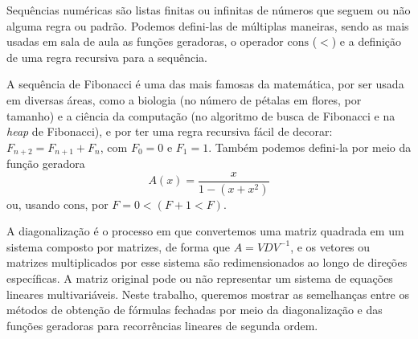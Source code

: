 
Sequências numéricas são listas finitas ou infinitas de números que seguem ou não alguma regra ou padrão. Podemos defini-las de múltiplas maneiras, sendo as mais usadas em sala de aula as funções geradoras, o operador $\mathrm{cons}$ ($<$) e a definição de uma regra recursiva para a sequência.

A sequência de Fibonacci é uma das mais famosas da matemática, por ser usada em diversas áreas, como a biologia (no número de pétalas em flores, por tamanho) e a ciência da computação (no algoritmo de busca de Fibonacci e na \textit{heap} de Fibonacci), e por ter uma regra recursiva fácil de decorar: $F_{n+2} = F_{n+1} + F_n$, com $F_0 = 0$ e $F_1 = 1$. Também podemos defini-la por meio da função geradora
\[
  A(x) = \dfrac{x}{1-(x+x^2)}
\]
ou, usando $\mathrm{cons}$, por $F = 0 < (F+1 < F)$.

A diagonalização é o processo em que convertemos uma matriz quadrada em um sistema composto por matrizes, de forma que $A = V D V^{-1}$, e os vetores ou matrizes multiplicados por esse sistema são redimensionados ao longo de direções específicas. A matriz original pode ou não representar um sistema de equações lineares multivariáveis. Neste trabalho, queremos mostrar as semelhanças entre os métodos de obtenção de fórmulas fechadas por meio da diagonalização e das funções geradoras para recorrências lineares de segunda ordem.
